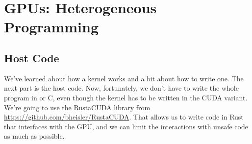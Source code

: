 




\section*{GPUs: Heterogeneous Programming}

\subsection*{Host Code}
We've learned about how a kernel works and a bit about how to write one. The next part is the host code. Now, fortunately, we don't have to write the whole program in \CPP{} or C, even though the kernel has to be written in the CUDA variant. We're going to use the RustaCUDA library from \url{https://github.com/bheisler/RustaCUDA}. That allows us to write code in Rust that interfaces with the GPU, and we can limit the interactions with unsafe code as much as possible.
 
